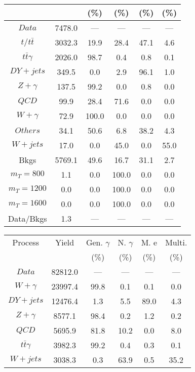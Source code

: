 \begin{figure}
\begin{minipage}[c]{0.32\textwidth}
{\begin{tabular}{cccccc}
 &  & (\%) & (\%) & (\%) & (\%)  \\
\hline
                                                                      $ Data $ &  7478.0 &  --- &  --- &  --- &  ---\\
$ t/t\bar{t} $ &  3032.3 &  19.9 &  28.4 &  47.1 &  4.6\\
$ t\bar{t}\gamma $ &  2026.0 &  98.7 &  0.4 &  0.8 &  0.1\\
$ DY+jets $ &  349.5 &  0.0 &  2.9 &  96.1 &  1.0\\
$ Z+\gamma $ &  137.5 &  99.2 &  0.0 &  0.8 &  0.0\\
$ QCD $ &  99.9 &  28.4 &  71.6 &  0.0 &  0.0\\
$ W+\gamma $ &  72.9 &  100.0 &  0.0 &  0.0 &  0.0\\
$ Others $ &  34.1 &  50.6 &  6.8 &  38.2 &  4.3\\
$ W+jets $ &  17.0 &  0.0 &  45.0 &  0.0 &  55.0\\
Bkgs &  5769.1 &  49.6 &  16.7 &  31.1 &  2.7\\
$ m_{T} = 800 $ &  1.1 &  0.0 &  100.0 &  0.0 &  0.0\\
$ m_{T} = 1200 $ &  0.0 &  0.0 &  100.0 &  0.0 &  0.0\\
$ m_{T} = 1600 $ &  0.0 &  0.0 &  100.0 &  0.0 &  0.0\\
Data/Bkgs &  1.3 &  --- &  --- &  --- &  ---\\
\hline
\end{tabular}
}
\end{minipage}
\begin{minipage}[c]{0.32\textwidth}
\centering
\tiny{
\begin{tabular}{cccccc}
\hline
Process & Yield & Gen. $\gamma$ & N. $\gamma$ & M. e & Multi. \\
 &  & (\%) & (\%) & (\%) & (\%)  \\
\hline
                                                                      $ Data $ &  82812.0 &  --- &  --- &  --- &  ---\\
$ W+\gamma $ &  23997.4 &  99.8 &  0.1 &  0.1 &  0.0\\
$ DY+jets $ &  12476.4 &  1.3 &  5.5 &  89.0 &  4.3\\
$ Z+\gamma $ &  8577.1 &  98.4 &  0.2 &  1.2 &  0.2\\
$ QCD $ &  5695.9 &  81.8 &  10.2 &  0.0 &  8.0\\
$ t\bar{t}\gamma $ &  3982.3 &  99.2 &  0.4 &  0.3 &  0.1\\
$ W+jets $ &  3038.3 &  0.3 &  63.9 &  0.5 &  35.2\\

\end{tabular}}
\end{minipage}
\end{figure}
